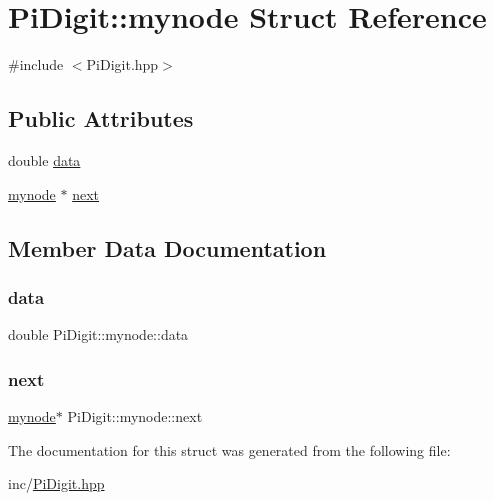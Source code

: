 \hypertarget{structPiDigit_1_1mynode}{}\section{Pi\+Digit\+:\+:mynode Struct Reference}
\label{structPiDigit_1_1mynode}


{\ttfamily \#include $<$Pi\+Digit.\+hpp$>$}

\subsection*{Public Attributes}
\begin{DoxyCompactItemize}
\item 
double \mbox{\hyperlink{structPiDigit_1_1mynode_a8efec9352bef7062f7e53b43b82cffb6}{data}}
\item 
\mbox{\hyperlink{structPiDigit_1_1mynode}{mynode}} $\ast$ \mbox{\hyperlink{structPiDigit_1_1mynode_a9dc7779f71ad992b976ccb43d83fcbbd}{next}}
\end{DoxyCompactItemize}


\subsection{Member Data Documentation}
\mbox{\label{structPiDigit_1_1mynode_a8efec9352bef7062f7e53b43b82cffb6}} 
\subsubsection{\texorpdfstring{data}{data}}
{\footnotesize\ttfamily double Pi\+Digit\+::mynode\+::data}

\mbox{\label{structPiDigit_1_1mynode_a9dc7779f71ad992b976ccb43d83fcbbd}} 
\subsubsection{\texorpdfstring{next}{next}}
{\footnotesize\ttfamily \mbox{\hyperlink{structPiDigit_1_1mynode}{mynode}}$\ast$ Pi\+Digit\+::mynode\+::next}



The documentation for this struct was generated from the following file\+:\begin{DoxyCompactItemize}
\item 
inc/\mbox{\hyperlink{PiDigit_8hpp}{Pi\+Digit.\+hpp}}\end{DoxyCompactItemize}
